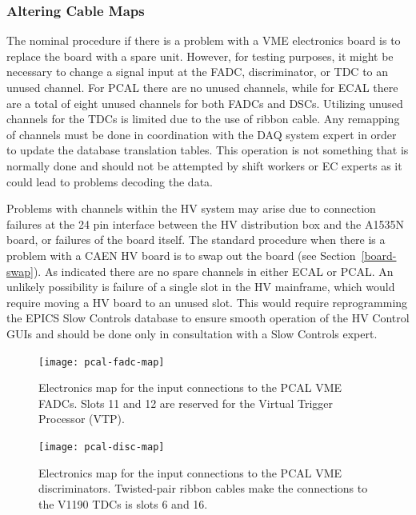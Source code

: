 \documentclass[letterpaper,10pt]{article}
\begin{document}
\subsubsection{Altering Cable Maps}

The nominal procedure if there is a problem with a VME electronics board is to replace the board
with a spare unit.  However, for testing purposes, it might be necessary to change a signal input
at the FADC, discriminator, or TDC to an unused channel. For PCAL there are no unused channels,
while for ECAL there are a total of eight unused channels for both FADCs and DSCs.  Utilizing
unused channels for the TDCs is limited due to the use of ribbon cable.  Any remapping of channels
must be done in coordination with the DAQ system expert in order to update the database translation 
tables. This operation is not something that is normally done and should not be attempted by shift
workers or EC experts as it could lead to problems decoding the data.

Problems with channels within the HV system may arise due to connection failures at the 24 pin
interface between the HV distribution box and the A1535N board, or failures of the board itself.
The standard procedure when there is a problem with a CAEN HV board is to swap out the board
(see Section~\ref{board-swap}).  As indicated there are no spare channels in either ECAL or PCAL.
An unlikely possibility is failure of a single slot in the HV mainframe, which would require
moving a HV board to an unused slot. This would require reprogramming the EPICS Slow Controls database
to ensure smooth operation of the HV Control GUIs and should be done only in consultation with a
Slow Controls expert. 


\begin{figure}
  \hspace{1cm}
  \texttt{[image: pcal-fadc-map]}
  \caption{Electronics map for the input connections to the PCAL VME FADCs.  Slots 11 and 12 are
  reserved for the Virtual Trigger Processor (VTP).}
  \label{pcal-fadc-map}
\end{figure}

\begin{figure}
  \hspace{1cm}
  \texttt{[image: pcal-disc-map]}
  \caption{Electronics map for the input connections to the PCAL VME discriminators. Twisted-pair ribbon
  cables make the connections to the V1190 TDCs is slots 6 and 16.}
  \label{pcal-disc-map}
\end{figure}
\end{document}
